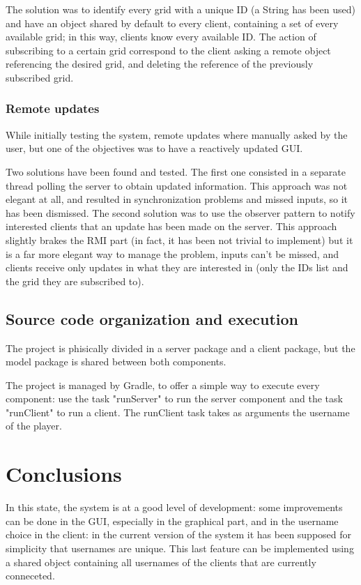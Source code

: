 \documentclass[12pt, a4paper]{report}
\begin{document}
The solution was to identify every grid with a unique ID (a String has been
 used) and have an object shared by default to every client, containing a set
 of every available grid; in this way, clients know every available ID. The
 action of subscribing to a certain grid correspond to the client asking a
 remote object referencing the desired grid, and deleting the reference of the
 previously subscribed grid.

\subsection{Remote updates}
While initially testing the system, remote updates where manually asked by the
 user, but one of the objectives was to have a reactively updated GUI.

Two solutions have been found and tested. The first one consisted in a separate
 thread polling the server to obtain updated information. This approach was not
 elegant at all, and resulted in synchronization problems and missed inputs, so
 it has been dismissed. The second solution was to use the observer pattern to
 notify interested clients that an update has been made on the server. This
 approach slightly brakes the RMI part (in fact, it has been not trivial to
 implement) but it is a far more elegant way to manage the problem, inputs
 can't be missed, and clients receive only updates in what they are interested
 in (only the IDs list and the grid they are subscribed to).

\section{Source code organization and execution}
The project is phisically divided in a server package and a client package, but
 the model package is shared between both components.

The project is managed by Gradle, to offer a simple way to execute every
 component: use the task "runServer" to run the server component and the task
 "runClient" to run a client. The runClient task takes as arguments the
 username of the player.

\chapter{Conclusions}
In this state, the system is at a good level of development: some improvements
 can be done in the GUI, especially in the graphical part, and in the
 username choice in the client: in the current version of the system it has
 been supposed for simplicity that usernames are unique. This last feature can
 be implemented using a shared object containing all usernames of the clients
 that are currently conneceted.



\end{document}
